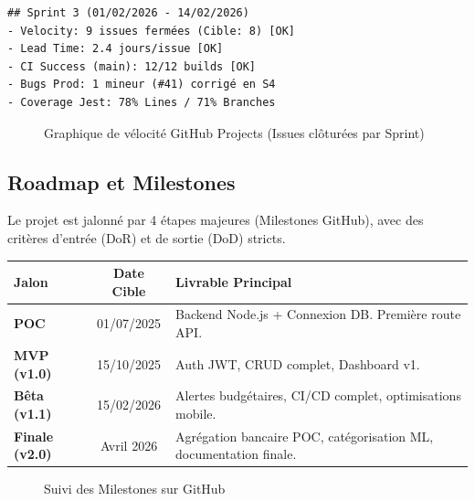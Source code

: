 \begin{tcolorbox}[colback=green!5!white,colframe=green!60!black,title=\textbf{Extrait réel du rapport de Sprint 3}]
\begin{verbatim}
## Sprint 3 (01/02/2026 - 14/02/2026)
- Velocity: 9 issues fermées (Cible: 8) [OK]
- Lead Time: 2.4 jours/issue [OK]
- CI Success (main): 12/12 builds [OK]
- Bugs Prod: 1 mineur (#41) corrigé en S4
- Coverage Jest: 78% Lines / 71% Branches
\end{verbatim}
\end{tcolorbox}

\begin{figure}[H]
    \centering
    \caption{Graphique de vélocité GitHub Projects (Issues clôturées par Sprint)}
    \label{fig:velocity}
\end{figure}

\subsection{Roadmap et Milestones}

Le projet est jalonné par 4 étapes majeures (Milestones GitHub), avec des critères d'entrée (DoR) et de sortie (DoD) stricts.

\begin{center}
\small
\begin{tabular}{|l|c|p{6cm}|}
\hline
\textbf{Jalon} & \textbf{Date Cible} & \textbf{Livrable Principal} \\
\hline
\textbf{POC} & 01/07/2025 & Backend Node.js + Connexion DB. Première route API. \\
\hline
\textbf{MVP (v1.0)} & 15/10/2025 & Auth JWT, CRUD complet, Dashboard v1. \\
\hline
\textbf{Bêta (v1.1)} & 15/02/2026 & Alertes budgétaires, CI/CD complet, optimisations mobile. \\
\hline
\textbf{Finale (v2.0)} & Avril 2026 & Agrégation bancaire POC, catégorisation ML, documentation finale. \\
\hline
\end{tabular}
\end{center}

\begin{figure}[H]
    \centering
    \caption{Suivi des Milestones sur GitHub}
    \label{fig:milestones}
\end{figure}

